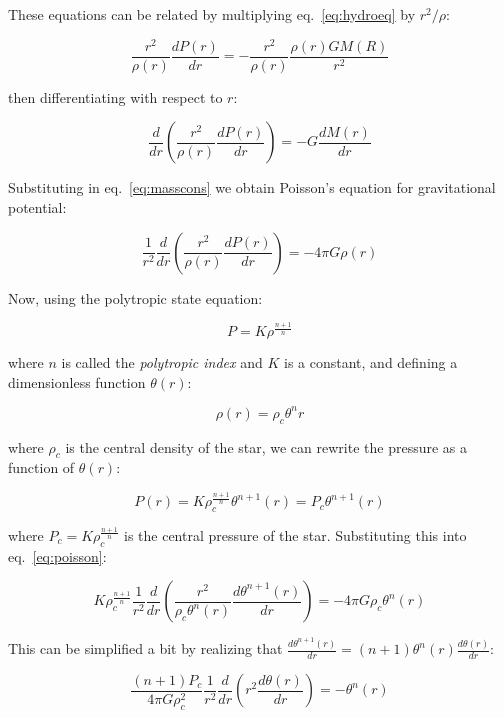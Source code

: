 \documentclass[twoside]{article}
\begin{document}
These equations can be related by multiplying eq.~\ref{eq:hydroeq} by
\(r^2/\rho\):

\[ \frac{r^2}{\rho(r)}\frac{dP(r)}{dr} = -\frac{r^2}{\rho(r)}
\frac{\rho(r)GM(R)}{r^2} \]

then differentiating with respect to \(r\):
            
\[
\frac{d}{dr}\left(\frac{r^2}{\rho(r)}\frac{dP(r)}{dr}\right)=-G\frac{dM(r)}{dr}
\]

Substituting in eq.~\ref{eq:masscons} we obtain Poisson's equation for gravitational potential:

\begin{equation}
    \label{eq:poisson}
    \frac{1}{r^2} \frac{d}{dr} \left( \frac{r^2}{\rho(r)}\frac{dP(r)}{dr} \right) = -4 \pi G\rho(r)
\end{equation}

Now, using the polytropic state equation:

\begin{equation}
    \label{eq:polytropstate}
    P=K\rho^{\frac{n+1}{n}}
\end{equation}

where \(n\) is called the \textit{polytropic index} and \(K\) is a constant, and
defining a dimensionless function \(\theta(r)\):

\begin{equation}
    \label{eq:thetar}
    \rho(r)=\rho_c\theta^n{r}
\end{equation}

where \(\rho_c\) is the central density of the star, we can rewrite the pressure
as a function of \(\theta(r)\):

            \[
                P(r)=K\rho_c^{\frac{n+1}{n}}\theta^{n+1}(r)=P_c\theta^{n+1}(r)
            \]

            where \(P_c=K\rho_c^{\frac{n+1}{n}}\) is the central pressure of the
            star. Substituting this into eq.~\ref{eq:poisson}:

            \[
                K\rho_c^{\frac{n+1}{n}}\frac{1}{r^2}\frac{d}{dr}\left(\frac{r^2}{\rho_c\theta^n(r)}\frac{d\theta^{n+1}(r)}{dr}\right)=-4\pi
                G\rho_c\theta^n(r)
            \]

            This can be simplified a bit by realizing that
            \(\frac{d\theta^{n+1}(r)}{dr}=(n+1)\theta^n(r)\frac{d\theta(r)}{dr}\):

            \begin{equation}
                \label{eq:simplpois}
                \frac{(n+1)P_c}{4\pi
                G\rho_c^2}\frac{1}{r^2}\frac{d}{dr}\left(r^2\frac{d\theta(r)}{dr}\right)=-\theta^n(r)
            \end{equation}
\end{document}
